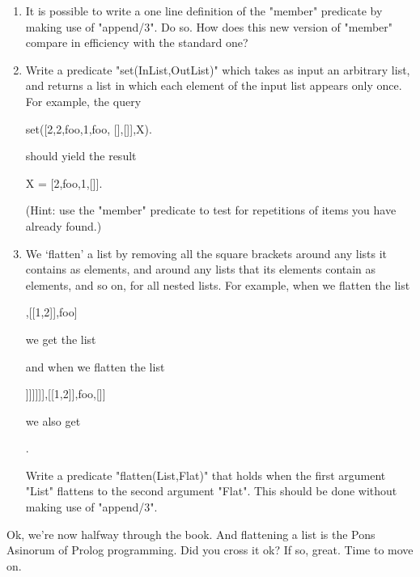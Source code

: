 \begin{enumerate}
\item{}It is possible to write a one line definition of the
"member" predicate by making use of "append/3". Do so. How
does this new version of "member" compare in efficiency with the
standard one?
\item{}Write a predicate "set(InList,OutList)" which takes as
input an arbitrary list, and returns a list in which each element of
the input list appears only once. For example, the query
\begin{LPNcodedisplay}

set([2,2,foo,1,foo, [],[]],X).
\end{LPNcodedisplay}

should yield the
result
\begin{LPNcodedisplay}

X = [2,foo,1,[]].
\end{LPNcodedisplay}

(Hint: use  the "member" predicate to test for repetitions
of items you have already found.)

\item{}We `flatten' a list by removing all the square brackets around
any lists it contains as elements, and around any lists that its
elements contain as elements, and so on, for all nested lists. For
example, when we flatten the list
\begin{LPNcodedisplay}
[a,b,[c,d],[[1,2]],foo]
\end{LPNcodedisplay}

we get the list
\begin{LPNcodedisplay}
[a,b,c,d,1,2,foo]
\end{LPNcodedisplay}

and when we flatten the list
\begin{LPNcodedisplay}
[a,b,[[[[[[[c,d]]]]]]],[[1,2]],foo,[]]
\end{LPNcodedisplay}
we also get
\begin{LPNcodedisplay}
[a,b,c,d,1,2,foo].
\end{LPNcodedisplay}
Write a predicate "flatten(List,Flat)" that holds when the first
argument "List" flattens to the second argument "Flat".
This should be done without making use of "append/3".
\end{enumerate}

\medskip

Ok, we're now halfway through the book. And flattening a list is the
Pons Asinorum of Prolog programming. Did you cross it ok?  If so,
great. Time to move on.
